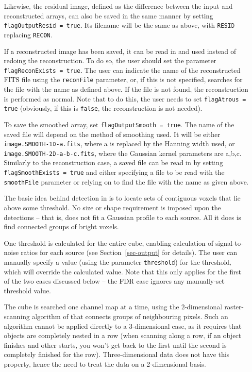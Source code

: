 Likewise, the residual image, defined as the difference between the
input and reconstructed arrays, can also be saved in the same manner
by setting \texttt{flagOutputResid = true}. Its filename will be the
same as above, with \texttt{RESID} replacing \texttt{RECON}.

If a reconstructed image has been saved, it can be read in and used
instead of redoing the reconstruction. To do so, the user should set
the parameter \texttt{flagReconExists = true}. The user can indicate
the name of the reconstructed FITS file using the \texttt{reconFile}
parameter, or, if this is not specified, \duchamp searches for the
file with the name as defined above. If the file is not found, the
reconstruction is performed as normal. Note that to do this, the user
needs to set \texttt{flagAtrous = true} (obviously, if this is
\texttt{false}, the reconstruction is not needed).

To save the smoothed array, set \texttt{flagOutputSmooth = true}. The
name of the saved file will depend on the method of smoothing used. It
will be either \texttt{image.SMOOTH-1D-a.fits}, where a is replaced by
the Hanning width used, or \texttt{image.SMOOTH-2D-a-b-c.fits}, where
the Gaussian kernel parameters are a,b,c. Similarly to the
reconstruction case, a saved file can be read in by setting
\texttt{flagSmoothExists = true} and either specifying a file to be
read with the \texttt{smoothFile} parameter or relying on \duchamp to
find the file with the name as given above.


\label{sec-detection}


The basic idea behind detection in \duchamp is to locate sets of
contiguous voxels that lie above some threshold. No size or shape
requirement is imposed upon the detections -- that is, \duchamp does
not fit \eg a Gaussian profile to each source. All it does is find
connected groups of bright voxels.

One threshold is calculated for the entire cube, enabling calculation
of signal-to-noise ratios for each source (see
Section~\ref{sec-output} for details). The user can manually specify a
value (using the parameter \texttt{threshold}) for the threshold,
which will override the calculated value. Note that this only applies
for the first of the two cases discussed below -- the FDR case ignores
any manually-set threshold value.

The cube is searched one channel map at a time, using the
2-dimensional raster-scanning algorithm of \citet{lutz80} that
connects groups of neighbouring pixels. Such an algorithm cannot be
applied directly to a 3-dimensional case, as it requires that objects
are completely nested in a row (when scanning along a row, if an
object finishes and other starts, you won't get back to the first
until the second is completely finished for the
row). Three-dimensional data does not have this property, hence the
need to treat the data on a 2-dimensional basis.

